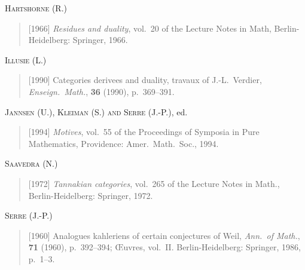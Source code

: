 \documentclass[11pt,a4paper]{article}
\theoremstyle{plain}
\theoremstyle{definition}
\begin{document}
\medskip
\noindent\textsc{Hartshorne (R.)}
\begin{quote}
[1966] \emph{Residues and duality}, vol.~20 of the Lecture Notes in Math, Berlin-Heidelberg: Springer, 1966.
\end{quote}

\medskip
\noindent\textsc{Illusie (L.)}
\begin{quote}
[1990] Categories derivees and duality, travaux of J.-L.~Verdier, \emph{Enseign.\ Math.}, \textbf{36} (1990), p.~369--391.
\end{quote}

\medskip
\noindent\textsc{Jannsen (U.), Kleiman (S.) and Serre (J.-P.)}, ed.
\begin{quote}
[1994] \emph{Motives}, vol.~55 of the Proceedings of Symposia in Pure Mathematics, Providence: Amer.\ Math.\ Soc., 1994.
\end{quote}

\medskip
\noindent\textsc{Saavedra (N.)}
\begin{quote}
[1972] \emph{Tannakian categories}, vol.~265 of the Lecture Notes in Math., Berlin-Heidelberg: Springer, 1972.
\end{quote}

\medskip
\noindent\textsc{Serre (J.-P.)}
\begin{quote}
[1960] Analogues kahleriens of certain conjectures of Weil, \emph{Ann.\ of Math.}, \textbf{71} (1960), p.~392--394; \OE uvres, vol.~II. Berlin-Heidelberg: Springer, 1986, p.~1--3.
\end{quote}
\end{document}
